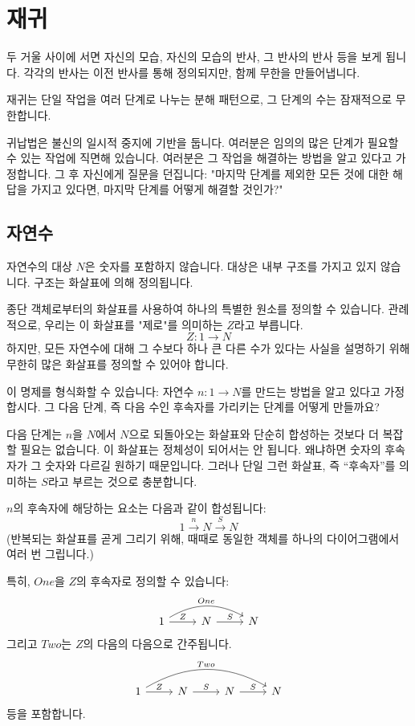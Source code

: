 \documentclass[DaoFP]{subfiles}
\begin{document}
\setcounter{chapter}{6}

\chapter{재귀}

두 거울 사이에 서면 자신의 모습, 자신의 모습의 반사, 그 반사의 반사 등을 보게 됩니다. 각각의 반사는 이전 반사를 통해 정의되지만, 함께 무한을 만들어냅니다.

재귀는 단일 작업을 여러 단계로 나누는 분해 패턴으로, 그 단계의 수는 잠재적으로 무한합니다.

귀납법은 불신의 일시적 중지에 기반을 둡니다. 여러분은 임의의 많은 단계가 필요할 수 있는 작업에 직면해 있습니다. 여러분은 그 작업을 해결하는 방법을 알고 있다고 가정합니다. 그 후 자신에게 질문을 던집니다: "마지막 단계를 제외한 모든 것에 대한 해답을 가지고 있다면, 마지막 단계를 어떻게 해결할 것인가?"

\section{자연수}

자연수의 대상 $N$은 숫자를 포함하지 않습니다. 대상은 내부 구조를 가지고 있지 않습니다. 구조는 화살표에 의해 정의됩니다.

종단 객체로부터의 화살표를 사용하여 하나의 특별한 원소를 정의할 수 있습니다. 관례적으로, 우리는 이 화살표를 "제로"를 의미하는 $Z$라고 부릅니다.
\[ Z \colon 1 \to N \]
하지만, 모든 자연수에 대해 그 수보다 하나 큰 다른 수가 있다는 사실을 설명하기 위해 무한히 많은 화살표를 정의할 수 있어야 합니다.

이 명제를 형식화할 수 있습니다: 자연수 $n \colon 1 \to N$를 만드는 방법을 알고 있다고 가정합시다. 그 다음 단계, 즉 다음 수인 후속자를 가리키는 단계를 어떻게 만들까요?

다음 단계는 $n$을 $N$에서 $N$으로 되돌아오는 화살표와 단순히 합성하는 것보다 더 복잡할 필요는 없습니다. 이 화살표는 정체성이 되어서는 안 됩니다. 왜냐하면 숫자의 후속자가 그 숫자와 다르길 원하기 때문입니다. 그러나 단일 그런 화살표, 즉 ``후속자''를 의미하는 $S$라고 부르는 것으로 충분합니다.

$n$의 후속자에 해당하는 요소는 다음과 같이 합성됩니다:
\[ 1 \xrightarrow{n} N \xrightarrow{S} N \]
(반복되는 화살표를 곧게 그리기 위해, 때때로 동일한 객체를 하나의 다이어그램에서 여러 번 그립니다.)

특히, $One$을 $Z$의 후속자로 정의할 수 있습니다:
\[
 \begin{tikzcd}
 1
 \arrow[rr, bend left, "One"]
 \arrow[r, "Z"]
 &N
  \arrow[r, "S"]
&N
  \end{tikzcd}
\]
그리고 $Two$는 $Z$의 다음의 다음으로 간주됩니다.
\[
 \begin{tikzcd}
 1
 \arrow[rrr, bend left, "Two"]
 \arrow[r, "Z"]
 &N
  \arrow[r, "S"]
&N
  \arrow[r, "S"]
 &N
 \end{tikzcd}
\]
등을 포함합니다.
\end{document}
